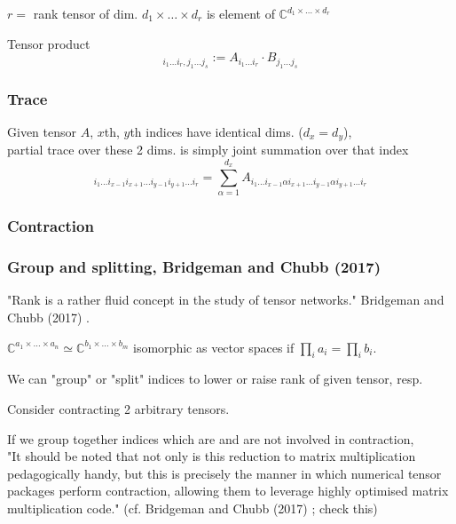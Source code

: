 \documentclass[10pt]{amsart}
\begin{document}
\begin{multicols*}{2}
$r=$ rank tensor of dim. $d_1\times \dots \times d_r$ is element of $\mathbb{C}^{d_1\times \dots \times d_r}$  

Tensor product
\begin{equation}
	[A \otimes B]_{i_1 \dots i_r, j_1 \dots j_s } := A_{i_1 \dots i_r} \cdot B_{j_1 \dots j_s }
\end{equation}

\subsubsection{Trace}
Given tensor $A$, $x$th, $y$th indices have identical dims. ($d_x = d_y$), \\
partial trace over these 2 dims. is simply joint summation over that index
\begin{equation}
	[\text{Tr}_{x,y} A]_{i_1\dots i_{x-1}i_{x+1} \dots i_{y-1}i_{y+1} \dots i_r} = \sum_{\alpha=1}^{d_x} A_{i_1 \dots i_{x-1} \alpha i_{x+1} \dots i_{y-1} \alpha i_{y+1} \dots i_r}
\end{equation}

\subsubsection{Contraction}

\subsubsection{Group and splitting, Bridgeman and Chubb (2017) \cite{BrCh2017} }

"Rank is a rather fluid concept in the study of tensor networks."  Bridgeman and Chubb (2017) \cite{BrCh2017}.  

$\mathbb{C}^{a_1 \times \dots \times a_n} \simeq \mathbb{C}^{b_1 \times \dots \times b_m}$ isomorphic as vector spaces if $\prod_i a_i = \prod_i b_i$.  

We can "group" or "split" indices to lower or raise rank of given tensor, resp.  

Consider contracting 2 arbitrary tensors.  

If we group together indices which are and are not involved in contraction, \\
"It should be noted that not only is this reduction to matrix multiplication pedagogically handy, but this is precisely the manner in which numerical tensor packages perform contraction, allowing them to leverage highly optimised matrix multiplication code." (cf. Bridgeman and Chubb (2017) \cite{BrCh2017}; check this)


\end{multicols*}
\end{document}
